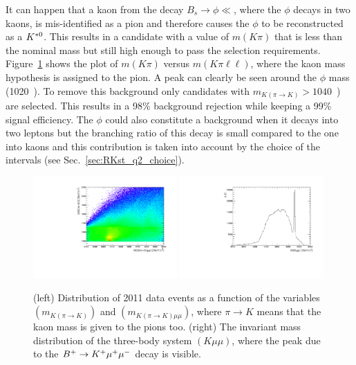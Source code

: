 It can happen that a kaon from the decay $B_s \rightarrow \phi \ll$, where the $\phi$ decays in two kaons,
is mis-identified as a pion and therefore causes the $\phi$ to be reconstructed as a ${{K}^{*0}}$. This results in
a candidate with a value of $m(K\pi)$ that is less than the nominal \Kstarz mass but still high enough to
pass the selection requirements. Figure~\ref{fig:phiplots} shows the plot of $m(K\pi)$ versus
$m(K\pi \ell\ell)$, where the kaon mass hypothesis is assigned to the pion. A peak can clearly be seen
around the $\phi$ mass (1020~\mevcc).
To remove this background only candidates with $m_{K(\pi\rightarrow K)} > 1040$~\mevcc) are selected.
This results in a 98\% background rejection while keeping a 99\% signal efficiency.
The $\phi$ could also constitute a background when it decays into two leptons but the
branching ratio of this decay is small compared to the one into kaons and this
contribution is taken into account by the choice of the \qsq intervals (see Sec.~\ref{sec:RKst_q2_choice}).

\begin{center}
\begin{figure}[h!]
\centering 
\includegraphics[width=0.49\textwidth]{RKst/figs/Background/phi.pdf}
\includegraphics[width=0.49\textwidth]{RKst/figs/Background/Kmumu.pdf}
\caption{ (left) Distribution of 2011 data events as a function of the variables $(m_{K(\pi\rightarrow K)})$ 
and $(m_{K(\pi\rightarrow K)\mu\mu})$, where $\pi\rightarrow K$ means that the kaon mass is given 
to the pions too. (right) The invariant mass distribution of the three-body system $(K\mu\mu)$,
where the peak due to the $B^+ \rightarrow K^+ {\mu^+\mu^-}$ decay is visible. }
\label{fig:phiplots}
\end{figure}
\end{center}


